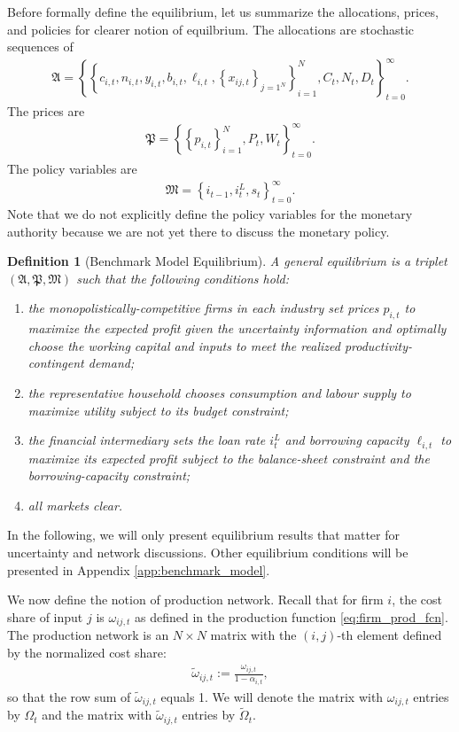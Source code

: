 \documentclass[12pt]{article}
\newtheorem{definition}{Definition}
\numberwithin{equation}{section}
\begin{document}
Before formally define the equilibrium, let us summarize the allocations, prices, and policies for clearer notion of equilbrium. The allocations are stochastic sequences of 
\begin{align*}
    \mathfrak{A} = \left\{\left\{c_{i,t}, n_{i,t}, y_{i,t}, b_{i,t}, \ell_{i,t}, \left\{x_{ij,t}\right\}_{j=1^N}\right\}_{i=1}^N, C_t, N_t, D_t\right\}_{t=0}^{\infty}.
\end{align*}
The prices are 
\begin{align*}
    \mathfrak{P} = \left\{\left\{p_{i,t}\right\}_{i=1}^N, P_t, W_t\right\}_{t=0}^\infty.
\end{align*}
The policy variables are
\begin{align*}
    \mathfrak{M} = \left\{i_{t-1}, i^L_t, s_t\right\}_{t=0}^\infty.
\end{align*}
Note that we do not explicitly define the policy variables for the monetary authority because we are not yet there to discuss the monetary policy.

\begin{definition}[Benchmark Model Equilibrium]\label{def:benchmark_equilibrium}
    A general equilibrium is a triplet $(\mathfrak{A}, \mathfrak{P}, \mathfrak{M})$ such that the following conditions hold:
    \begin{enumerate}
        \item the monopolistically-competitive firms in each industry set prices $p_{i,t}$ to maximize the expected profit given the uncertainty information and optimally choose the working capital and inputs to meet the realized productivity-contingent demand;
        \item the representative household chooses consumption and labour supply to maximize utility subject to its budget constraint;
        \item the financial intermediary sets the loan rate $i^L_t$ and borrowing capacity $\ell_{i,t}$ to maximize its expected profit subject to the balance-sheet constraint and the borrowing-capacity constraint;
        \item all markets clear.
    \end{enumerate}
\end{definition}

In the following, we will only present equilibrium results that matter for uncertainty and network discussions. Other equilibrium conditions will be presented in Appendix \ref{app:benchmark_model}. 

We now define the notion of production network. Recall that for firm $i$, the cost share of input $j$ is $\omega_{ij,t}$ as defined in the production function \eqref{eq:firm_prod_fcn}. The production network is an $N \times N$ matrix with the $(i,j)$-th element defined by the normalized cost share:
\begin{align*}
    \tilde{\omega}_{ij,t} := \frac{\omega_{ij,t}}{1-\alpha_{i,t}},
\end{align*}
so that the row sum of $\tilde{\omega}_{ij,t}$ equals 1. We will denote the matrix with $\omega_{ij,t}$ entries by $\Omega_t$ and the matrix with $\tilde{\omega}_{ij,t}$ entries by $\tilde{\Omega}_t$.
\end{document}
